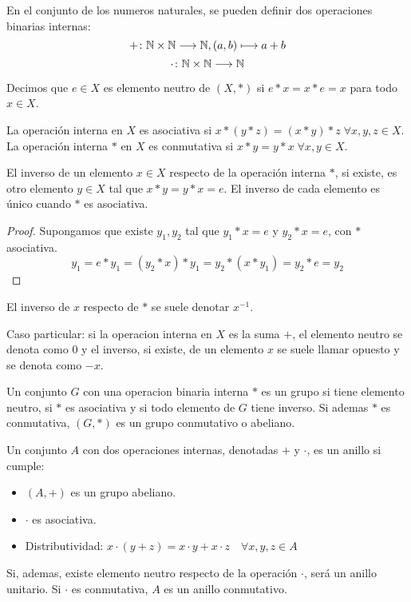 \begin{example}
	En el conjunto de los numeros naturales, se pueden definir dos operaciones binarias internas:
	\[+ \colon \mathbb{N} \times \mathbb{N} \longrightarrow \mathbb{N}, (a,b) \longmapsto a + b\]
	\[
		\cdot \colon \mathbb{N} \times \mathbb{N} \longrightarrow \mathbb{N}
	\]
\end{example}

Decimos que \(e \in X \) es elemento neutro de \((X, * )\) si \(e * x = x * e = x\) para todo \(x \in X\).

La operación interna en \(X \) es asociativa si \(x * (y * z) = (x * y ) * z \; \forall x,y,z \in X \). La operación interna \(* \) en \(X \) es conmutativa si \(x * y = y * x \; \forall x,y \in X\).

El inverso de un elemento \(x \in X\) respecto de la operación interna \(* \), si existe, es otro elemento \(y \in X\) tal que \(x * y = y * x = e\). El inverso de cada elemento es único cuando \(* \) es asociativa.

\begin{proof}
	Supongamos que existe \(y_1, y_{2}\) tal que \(y_1 * x = e \) y \(y_2 * x = e \), con \(* \) asociativa.
	\[
		y_1 = e * y_1 = (y_2 * x) * y_1 = y_2 * (x * y_1) = y_2 * e = y_2
	\]
\end{proof}
El inverso de \(x \) respecto de \(* \) se suele denotar \(x^{-1} \).

Caso particular: si la operacion interna en \(X \) es la suma \(+ \), el elemento neutro se denota como \(0 \) y el inverso, si existe, de un elemento \(x \) se suele llamar opuesto y se denota como \(-x \).

\begin{definition}[Grupo]
	Un conjunto \(G \) con una operacion binaria interna \(* \) es un grupo si tiene elemento neutro, si \(* \) es asociativa y si todo elemento de \(G \) tiene inverso. Si ademas \(* \) es conmutativa, \((G, * )\) es un grupo conmutativo o abeliano.
\end{definition}

\begin{definition}[Anillo]
	Un conjunto \(A \) con dos operaciones internas, denotadas \(+ \) y \(\cdot \), es un anillo si cumple:
	\begin{itemize}
		\item \((A,+)\) es un grupo abeliano.
		\item \(\cdot \) es asociativa.
		\item Distributividad: \(x \cdot (y + z ) = x \cdot y + x \cdot z \quad \forall x,y,z \in A\)
	\end{itemize}
	Si, ademas, existe elemento neutro respecto de la operación \(\cdot \), será un anillo unitario. Si \(\cdot \) es conmutativa, \(A \) es un anillo conmutativo.
\end{definition}

